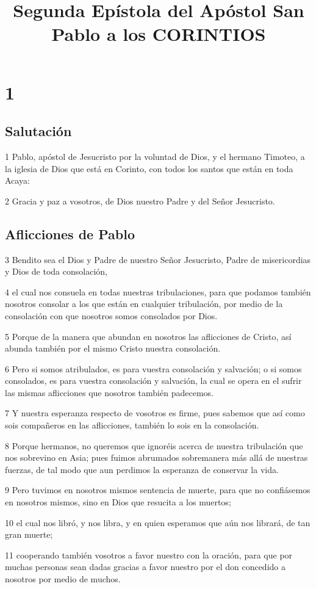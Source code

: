 
\title{Segunda Epístola del Apóstol San Pablo a los CORINTIOS}

\chapter{1}

\section*{Salutación}

\par 1 Pablo, apóstol de Jesucristo por la voluntad de Dios, y el hermano Timoteo, a la iglesia de Dios que está en Corinto, con todos los santos que están en toda Acaya:
\par 2 Gracia y paz a vosotros, de Dios nuestro Padre y del Señor Jesucristo.

\section*{Aflicciones de Pablo}

\par 3 Bendito sea el Dios y Padre de nuestro Señor Jesucristo, Padre de misericordias y Dios de toda consolación,
\par 4 el cual nos consuela en todas nuestras tribulaciones, para que podamos también nosotros consolar a los que están en cualquier tribulación, por medio de la consolación con que nosotros somos consolados por Dios.
\par 5 Porque de la manera que abundan en nosotros las aflicciones de Cristo, así abunda también por el mismo Cristo nuestra consolación.
\par 6 Pero si somos atribulados, es para vuestra consolación y salvación; o si somos consolados, es para vuestra consolación y salvación, la cual se opera en el sufrir las mismas aflicciones que nosotros también padecemos.
\par 7 Y nuestra esperanza respecto de vosotros es firme, pues sabemos que así como sois compañeros en las aflicciones, también lo sois en la consolación.
\par 8 Porque hermanos, no queremos que ignoréis acerca de nuestra tribulación que nos sobrevino en Asia; pues fuimos abrumados sobremanera más allá de nuestras fuerzas, de tal modo que aun perdimos la esperanza de conservar la vida.
\par 9 Pero tuvimos en nosotros mismos sentencia de muerte, para que no confiásemos en nosotros mismos, sino en Dios que resucita a los muertos;
\par 10 el cual nos libró, y nos libra, y en quien esperamos que aún nos librará, de tan gran muerte;
\par 11 cooperando también vosotros a favor nuestro con la oración, para que por muchas personas sean dadas gracias a favor nuestro por el don concedido a nosotros por medio de muchos.

